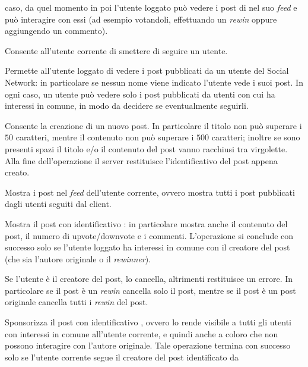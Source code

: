 \documentclass[
    oneside,
    10pt,
    language=italian,
    a4paper,
    article
]{notes}
\begin{document}
\begin{description}
        caso, da quel momento in poi l'utente loggato può vedere i post di
         nel suo \emph{feed} e può interagire con essi (ad esempio
        votandoli, effettuando un \emph{rewin} oppure aggiungendo un commento).
    \item[\mono{unfollow <username>}] Consente all'utente corrente di smettere
        di seguire un utente.
    \item[\mono{blog [<username>]}] Permette all'utente loggato di vedere i post
        pubblicati da un utente del Social Network: in particolare se nessun nome
        viene indicato l'utente vede i suoi post. In ogni caso, un utente può
        vedere solo i post pubblicati da utenti con cui ha interessi in comune,
        in modo da decidere se eventualmente seguirli.
    \item[\mono{post <title> <contents>}] Consente la creazione di un nuovo post.
        In particolare il titolo non può superare i $50$ caratteri, mentre il contenuto
        non può superare i $500$ caratteri; inoltre se sono presenti spazi il titolo
        e/o il contenuto del post vanno racchiusi tra virgolette.
        Alla fine dell'operazione il server restituisce l'identificativo del 
        post appena creato.
    \item[\mono{show feed}] Mostra i post nel \emph{feed} dell'utente corrente,
        ovvero mostra tutti i post pubblicati dagli utenti seguiti dal client.
    \item[\mono{show post <idPost>}] Mostra il post con identificativo :
        in particolare mostra anche il contenuto del post, il numero di 
        upvote/downvote e i commenti.  
        L'operazione si conclude con successo solo se l'utente loggato ha interessi
        in comune con il creatore del post (che sia l'autore originale o il 
        \emph{rewinner}).
    \item[\mono{delete <idPost>}] Se l'utente è il creatore del post, lo cancella,
        altrimenti restituisce un errore. In particolare se il post è un \emph{rewin}
        cancella solo il post, mentre se il post è un post originale cancella 
        tutti i \emph{rewin} del post.
    \item[\mono{rewin <idPost>}] Sponsorizza il post con identificativo 
        , ovvero lo rende visibile a tutti gli utenti con interessi
        in comune all'utente corrente, e quindi anche a coloro che non possono
        interagire con l'autore originale. Tale operazione termina con successo
        solo se l'utente corrente segue il creatore del post identificato da

\end{description}
\end{document}
